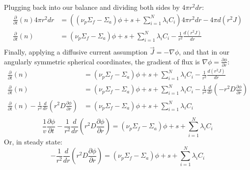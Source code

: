 \documentclass[11pt]{article}
\newcommand{\volume}{\mathop{\ooalign{\hfil$V$\hfil\cr\kern0.08em--\hfil\cr}}\nolimits} %
\newcommand{\Nc}{\mathscr{N}}
\newcommand{\ddt}{\frac{\partial}{\partial t}}
\begin{document}
\begin{enumerate}
{    Plugging back into our balance and dividing both sides by $4\pi r^2dr$:
    \begin{align*}
        \ddt(n)4\pi r^2d r &= \left((\nu_p\Sigma_f-\Sigma_a)\phi + s + \sum_{i=1}^{N}\lambda_iC_i\right)4\pi r^2d r-4\pi d(r^2J) \\
        \ddt(n)&= (\nu_p\Sigma_f-\Sigma_a)\phi + s + \sum_{i=1}^{N}\lambda_iC_i    - \frac{1}{r^2}\frac{d(r^2J)}{dr} \\
    \end{align*}
    Finally, applying a diffusive current assumption $\vec{J}=-\nabla\phi$, and that in our angularly symmetric spherical coordinates, the gradient of flux is $\nabla\phi=\frac{\partial\phi}{\partial r}$:
    \begin{align*}
        \ddt(n)&= (\nu_p\Sigma_f-\Sigma_a)\phi + s + \sum_{i=1}^{N}\lambda_iC_i    - \frac{1}{r^2}\frac{d(r^2J)}{dr} \\
        \ddt(n)&= (\nu_p\Sigma_f-\Sigma_a)\phi + s + \sum_{i=1}^{N}\lambda_iC_i    - \frac{1}{r^2}\frac{d}{dr}\left(-r^2 D \frac{\partial\phi}{\partial r}\right) \\
        \ddt(n)- \frac{1}{r^2}\frac{d}{dr}\left(r^2 D \frac{\partial\phi}{\partial r}\right)&= (\nu_p\Sigma_f-\Sigma_a)\phi + s + \sum_{i=1}^{N}\lambda_iC_i \\
    \end{align*}
    \begin{equation*}
        \boxed{\frac{1}{v}\frac{\partial\phi}{\partial t}- \frac{1}{r^2}\frac{d}{dr}\left(r^2 D \frac{\partial\phi}{\partial r}\right)= (\nu_p\Sigma_f-\Sigma_a)\phi + s + \sum_{i=1}^{N}\lambda_iC_i}
    \end{equation*}
    Or, in steady state:
    \begin{equation*}
        \boxed{- \frac{1}{r^2}\frac{d}{dr}\left(r^2 D \frac{\partial\phi}{\partial r}\right)= (\nu_p\Sigma_f-\Sigma_a)\phi + s + \sum_{i=1}^{N}\lambda_iC_i}
    \end{equation*}

}
\end{enumerate}
\end{document}
